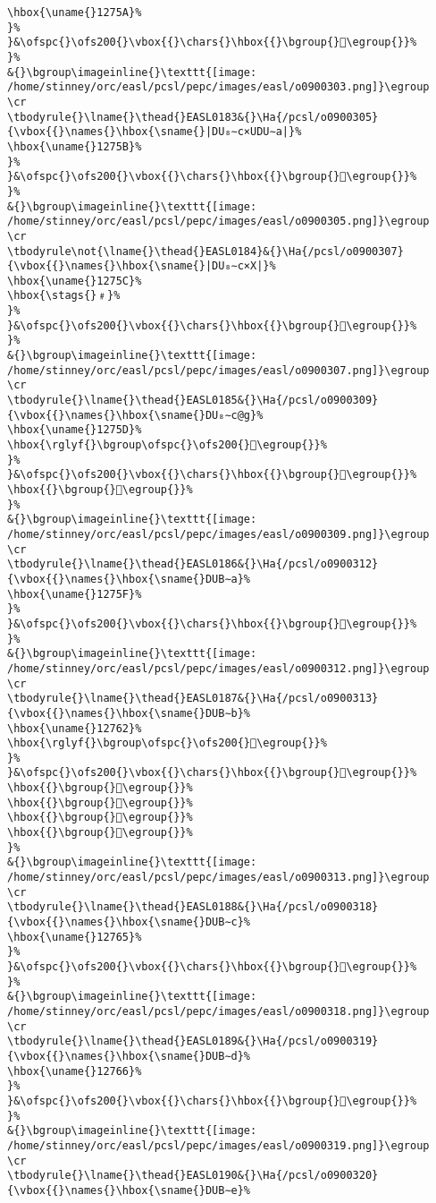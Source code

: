 \begin{verbatim}
\hbox{\uname{}1275A}%
}%
}&\ofspc{}\ofs200{}\vbox{{}\chars{}\hbox{{}\bgroup{}𒝚\egroup{}}%
}%
&{}\bgroup\imageinline{}\texttt{[image: /home/stinney/orc/easl/pcsl/pepc/images/easl/o0900303.png]}\egroup
\cr
\tbodyrule{}\lname{}\thead{}EASL0183&{}\Ha{/pcsl/o0900305}{\vbox{{}\names{}\hbox{\sname{}|DU₈∼c×UDU∼a|}%
\hbox{\uname{}1275B}%
}%
}&\ofspc{}\ofs200{}\vbox{{}\chars{}\hbox{{}\bgroup{}𒝛\egroup{}}%
}%
&{}\bgroup\imageinline{}\texttt{[image: /home/stinney/orc/easl/pcsl/pepc/images/easl/o0900305.png]}\egroup
\cr
\tbodyrule\not{\lname{}\thead{}EASL0184}&{}\Ha{/pcsl/o0900307}{\vbox{{}\names{}\hbox{\sname{}|DU₈∼c×X|}%
\hbox{\uname{}1275C}%
\hbox{\stags{}﹟}%
}%
}&\ofspc{}\ofs200{}\vbox{{}\chars{}\hbox{{}\bgroup{}𒝜\egroup{}}%
}%
&{}\bgroup\imageinline{}\texttt{[image: /home/stinney/orc/easl/pcsl/pepc/images/easl/o0900307.png]}\egroup
\cr
\tbodyrule{}\lname{}\thead{}EASL0185&{}\Ha{/pcsl/o0900309}{\vbox{{}\names{}\hbox{\sname{}DU₈∼c@g}%
\hbox{\uname{}1275D}%
\hbox{\rglyf{}\bgroup\ofspc{}\ofs200{}𒝝\egroup{}}%
}%
}&\ofspc{}\ofs200{}\vbox{{}\chars{}\hbox{{}\bgroup{}𒝝\egroup{}}%
\hbox{{}\bgroup{}𒝞\egroup{}}%
}%
&{}\bgroup\imageinline{}\texttt{[image: /home/stinney/orc/easl/pcsl/pepc/images/easl/o0900309.png]}\egroup
\cr
\tbodyrule{}\lname{}\thead{}EASL0186&{}\Ha{/pcsl/o0900312}{\vbox{{}\names{}\hbox{\sname{}DUB∼a}%
\hbox{\uname{}1275F}%
}%
}&\ofspc{}\ofs200{}\vbox{{}\chars{}\hbox{{}\bgroup{}𒝟\egroup{}}%
}%
&{}\bgroup\imageinline{}\texttt{[image: /home/stinney/orc/easl/pcsl/pepc/images/easl/o0900312.png]}\egroup
\cr
\tbodyrule{}\lname{}\thead{}EASL0187&{}\Ha{/pcsl/o0900313}{\vbox{{}\names{}\hbox{\sname{}DUB∼b}%
\hbox{\uname{}12762}%
\hbox{\rglyf{}\bgroup\ofspc{}\ofs200{}𒝢\egroup{}}%
}%
}&\ofspc{}\ofs200{}\vbox{{}\chars{}\hbox{{}\bgroup{}𒝡\egroup{}}%
\hbox{{}\bgroup{}𒝠\egroup{}}%
\hbox{{}\bgroup{}𒝣\egroup{}}%
\hbox{{}\bgroup{}𒝢\egroup{}}%
\hbox{{}\bgroup{}𒝤\egroup{}}%
}%
&{}\bgroup\imageinline{}\texttt{[image: /home/stinney/orc/easl/pcsl/pepc/images/easl/o0900313.png]}\egroup
\cr
\tbodyrule{}\lname{}\thead{}EASL0188&{}\Ha{/pcsl/o0900318}{\vbox{{}\names{}\hbox{\sname{}DUB∼c}%
\hbox{\uname{}12765}%
}%
}&\ofspc{}\ofs200{}\vbox{{}\chars{}\hbox{{}\bgroup{}𒝥\egroup{}}%
}%
&{}\bgroup\imageinline{}\texttt{[image: /home/stinney/orc/easl/pcsl/pepc/images/easl/o0900318.png]}\egroup
\cr
\tbodyrule{}\lname{}\thead{}EASL0189&{}\Ha{/pcsl/o0900319}{\vbox{{}\names{}\hbox{\sname{}DUB∼d}%
\hbox{\uname{}12766}%
}%
}&\ofspc{}\ofs200{}\vbox{{}\chars{}\hbox{{}\bgroup{}𒝦\egroup{}}%
}%
&{}\bgroup\imageinline{}\texttt{[image: /home/stinney/orc/easl/pcsl/pepc/images/easl/o0900319.png]}\egroup
\cr
\tbodyrule{}\lname{}\thead{}EASL0190&{}\Ha{/pcsl/o0900320}{\vbox{{}\names{}\hbox{\sname{}DUB∼e}%

\end{verbatim}
